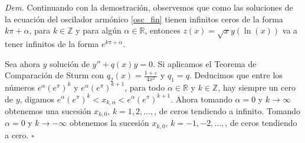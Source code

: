 \documentclass{article}
\newenvironment{demo}{\noindent\emph{Dem.}}{{\hspace*{\fill}$\square$} \newline\vspace{5pt}}
\renewcommand{\epsilon}{\varepsilon}
\begin{document}
\begin{demo}
Continuando con la demostración, observemos que como las soluciones de la ecuación del oscilador armónico \eqref{osc_fin} tienen infinitos ceros de la forma $k\pi+\alpha$, para $k\in\mathbb{Z}$ y para algún $\alpha\in\mathbb{R}$, entonces $z(x)=\sqrt{x}y(\ln(x))$ va a tener infinitos
de la forma $e^{k\pi+\alpha}$. 

Sea ahora $y$ solución de $y''+q(x)y=0$. Si aplicamos el Teorema de Comparación de Sturm con $q_2(x)=\frac{1+\epsilon}{4x^2}$ y $q_1=q$. Deducimos que entre los números  $e^{\alpha}(e^{\pi})^k$ y $e^{\alpha}(e^{\pi})^{k+1}$, para todo $\alpha\in\mathbb{R}$ y $k\in\mathbb{Z}$, hay siempre un cero de $y$, digamos  $e^{\alpha}(e^{\pi})^k<x_{k,\alpha}<e^{\alpha}(e^{\pi})^{k+1}$. Ahora tomando $\alpha=0$ y $k\to\infty$ obtenemos una sucesión $x_{k,0}$, $k=1,2,\ldots,$, de ceros tendiendo a infinito. Tomando $\alpha=0$ y   $k\to-\infty$ obtenemos la sucesión $x_{k,0}$, $k=-1,-2,\ldots,$, de ceros tendiendo a cero.
\end{demo}
\end{document}
